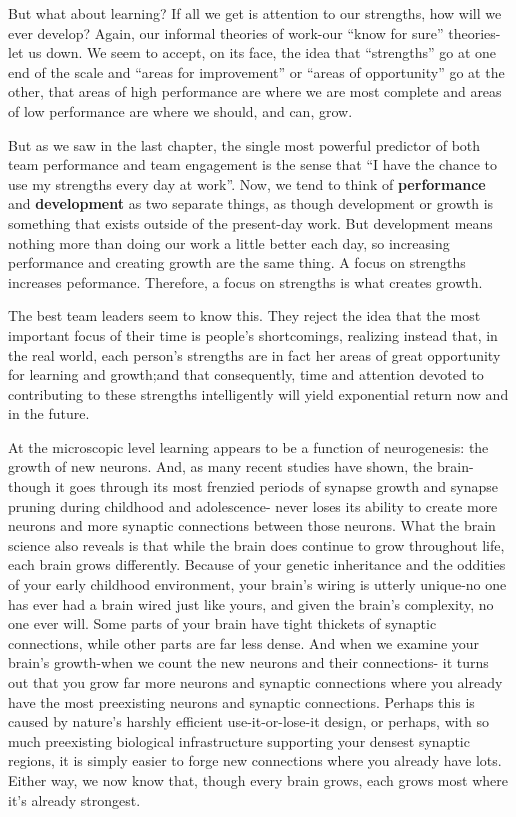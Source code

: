 \documentclass[ebook,12pt,oneside,openany]{memoir}
\begin{document}
But what about learning? If all we get is attention to our strengths, how will we ever develop?
Again, our informal theories of work-our ``know for sure'' theories-let us down.
We seem to accept, on its face, the idea that ``strengths'' go at one end of the scale
and ``areas for improvement'' or ``areas of opportunity'' go at the other, that areas of high performance
are where we are most complete and areas of low performance are where we should, and can, grow.

But as we saw in the last chapter, the single most powerful predictor of both team performance and team engagement is the sense
that ``I have the chance to use my strengths every day at work''.
Now, we tend to think of \textbf{performance} and \textbf{development}
as two separate things, as though development or growth is something that exists outside of the present-day work.
But development means nothing more than doing our work a little better each day, so increasing performance and creating
growth are the same thing. A focus on strengths increases peformance.
Therefore, a focus on strengths is what creates growth.

The best team leaders seem to know this. They reject the idea that the most important focus of their time is 
people's shortcomings, realizing instead that, in the real world, each person's strengths are in fact her areas of great opportunity
for learning and growth;and that consequently, time and attention devoted to contributing to these strengths intelligently will yield
exponential return now and in the future. 

At the microscopic level learning appears to be a function of neurogenesis:
the growth of new neurons. And, as many recent studies have shown, the brain-though it goes through 
its most frenzied periods of synapse growth and synapse pruning during childhood and adolescence-
never loses its ability to create more neurons and more synaptic connections between those neurons.
What the brain science also reveals is that while the brain does continue to grow throughout life, 
each brain grows differently. 
Because of your genetic inheritance and the oddities of your early childhood environment, 
your brain's wiring is utterly unique-no one has ever had a brain wired just like yours, and given the brain's complexity,
no one ever will.
Some parts of your brain have tight thickets of synaptic connections, while other parts are far less dense.
And when we examine your brain's growth-when we count the new neurons and their connections-
it turns out that you grow far more neurons and synaptic connections where you already have the most 
preexisting neurons and synaptic connections.
Perhaps this is caused by nature's harshly efficient use-it-or-lose-it design, or perhaps, with so much preexisting
biological infrastructure supporting your densest synaptic regions, it is simply easier to forge new connections where you
already have lots. Either way, we now know that, though every brain grows, 
each grows most where it's already strongest.
\end{document}
